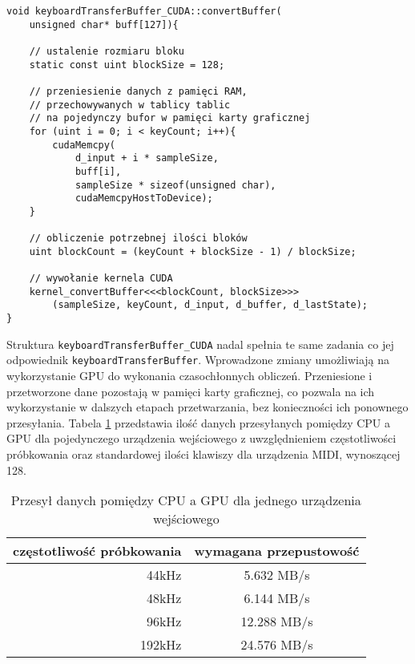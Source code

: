 \begin{lstlisting}
void keyboardTransferBuffer_CUDA::convertBuffer(
    unsigned char* buff[127]){

    // ustalenie rozmiaru bloku
    static const uint blockSize = 128;

    // przeniesienie danych z pamięci RAM,
    // przechowywanych w tablicy tablic
    // na pojedynczy bufor w pamięci karty graficznej
    for (uint i = 0; i < keyCount; i++){
        cudaMemcpy(
            d_input + i * sampleSize,
            buff[i],
            sampleSize * sizeof(unsigned char),
            cudaMemcpyHostToDevice);
    }

    // obliczenie potrzebnej ilości bloków
    uint blockCount = (keyCount + blockSize - 1) / blockSize;

    // wywołanie kernela CUDA
    kernel_convertBuffer<<<blockCount, blockSize>>>
        (sampleSize, keyCount, d_input, d_buffer, d_lastState);
}
\end{lstlisting}

\clearpage
Struktura \texttt{keyboardTransferBuffer\_CUDA} nadal spełnia te same zadania co jej odpowiednik \texttt{keyboardTransferBuffer}. Wprowadzone zmiany umożliwiają na wykorzystanie GPU do wykonania czasochłonnych obliczeń. Przeniesione i przetworzone dane pozostają w pamięci karty graficznej, co pozwala na ich wykorzystanie w dalszych etapach przetwarzania, bez konieczności ich ponownego przesyłania. Tabela \ref{tab:Przesył danych pomiędzy CPU a GPU dla jednego urządzenia wejściowego} przedstawia ilość danych przesyłanych pomiędzy CPU a GPU dla pojedynczego urządzenia wejściowego z uwzględnieniem częstotliwości próbkowania oraz standardowej ilości klawiszy dla urządzenia MIDI, wynoszącej 128.

\begin{table}[H]
    \begin{center}
        \caption{Przesył danych pomiędzy CPU a GPU dla jednego urządzenia wejściowego}
        \label{tab:Przesył danych pomiędzy CPU a GPU dla jednego urządzenia wejściowego}
        \begin{tabular}{r|c}
            częstotliwość próbkowania  &   wymagana przepustowość \\
            \hline
            44kHz                      &   5.632 MB/s   \\
            48kHz                      &   6.144 MB/s   \\
            96kHz                      &   12.288 MB/s  \\
            192kHz                     &   24.576 MB/s  \\
        \end{tabular}
    \end{center}
\end{table}

